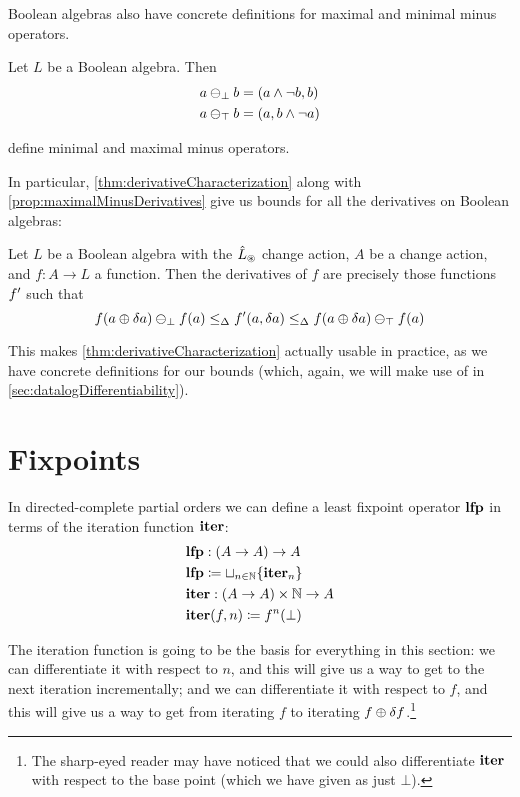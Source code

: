Boolean algebras also have concrete definitions for maximal and minimal minus
operators.

\begin{prop}
  Let $L$ be a Boolean algebra. Then
  \begin{align*}
    a \ominus_\bot b &= (a \wedge \neg b, b)\\
    a \ominus_\top b &= (a, b \wedge \neg a)
  \end{align*}

  define minimal and maximal minus operators.
\end{prop}

In particular, \cref{thm:derivativeCharacterization} along with
\cref{prop:maximalMinusDerivatives} give us bounds for
all the derivatives on Boolean algebras:

\begin{corollary}
\label{cor:booleanCharacterization}
  Let $L$ be a Boolean algebra with the $\hat{L}_\circledast$ change action, $A$ be
  a change action, and $f: A \rightarrow
  L$ a function. Then the derivatives of $f$ are precisely those functions
  $f'$ such that
  \begin{displaymath}
    f(a \oplus \delta a) \ominus_\bot f(a)
    \leq_\Delta
    f'(a, \delta a)
    \leq_\Delta
    f(a \oplus \delta a) \ominus_\top f(a)
  \end{displaymath}
\end{corollary}

This makes \cref{thm:derivativeCharacterization} actually usable in practice, as
we have concrete definitions for our bounds (which, again, we will make use of in \cref{sec:datalogDifferentiability}).

\section{Fixpoints}
\label{sec:fixpoints}

In directed-complete partial orders we can define a least fixpoint operator $\mathbf{lfp}$ in terms of the
iteration function $\mathbf{iter}$:
\begin{align*}
  &\mathbf{lfp} : (A \rightarrow A) \rightarrow A\\
  &\mathbf{lfp} \coloneqq \sqcup_{n \in \mathbb{N}} \{ \mathbf{iter}_n \}\\
  &\mathbf{iter} : (A \rightarrow A) \times \mathbb{N} \rightarrow A\\
  &\mathbf{iter}(f, n) \coloneqq f^n(\bot)
\end{align*}

The iteration function is going to be the basis for everything in this section:
we can differentiate it with respect to $n$, and this will give us a way to get
to the next iteration incrementally; and we can differentiate it with respect to
$f$, and this will give us a way to get from iterating $f$ to iterating $f
\oplus \delta f$.\footnote{The sharp-eyed reader may have noticed that we
  could also differentiate $\mathbf{iter}$ with respect to the base point (which we have
  given as just $\bot$).}


